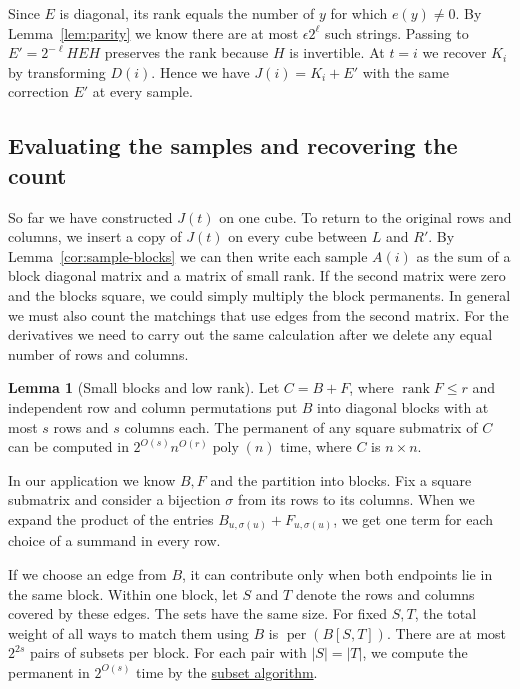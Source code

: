 \documentclass{article}
\theoremstyle{definition}
\newtheorem{lemma}[theorem]{Lemma}
\DeclareMathOperator{\per}{per}
\DeclareMathOperator{\rank}{rank}
\begin{document}
Since \(E\) is diagonal, its rank equals the number of \(y\) for
which \(e(y)\ne0\). By Lemma~\ref{lem:parity} we know there are
at most \(\epsilon 2^\ell\) such strings. Passing to
\(E'=2^{-\ell}HEH\) preserves the rank because \(H\) is invertible. At \(t=i\) we
recover \(K_i\) by transforming \(D(i)\). Hence we have
\(J(i)=K_i+E'\) with the same correction \(E'\) at every sample.

\subsection*{Evaluating the samples and recovering the count}\label{sec:sample-evaluation}

So far we have constructed \(J(t)\) on one cube. To return to the
original rows and columns, we insert a copy of \(J(t)\) on every
cube between \(L\) and \(R'\). By Lemma~\ref{cor:sample-blocks} we can
then write each sample \(A(i)\) as the sum of a block
diagonal matrix and a matrix of small rank. If the second matrix were
zero and the blocks square, we could simply multiply the block
permanents. In general we must also count the matchings that use edges
from the second matrix. For the derivatives we need to carry out the same
calculation after we delete any equal number of rows and columns.

\begin{lemma}[Small blocks and low rank]\label{lem:blocks}
Let \(C=B+F\), where \(\rank F\le r\) and independent row and column
permutations put \(B\) into diagonal blocks with at most \(s\) rows and
\(s\) columns each. The permanent of any square submatrix of \(C\) can
be computed in \(2^{O(s)}n^{O(r)}\operatorname{poly}(n)\) time, where
\(C\) is \(n\times n\).
\end{lemma}

In our application we know \(B,F\) and the partition into blocks.
Fix a square submatrix and consider a bijection \(\sigma\) from its rows
to its columns. When we expand the product of the entries
\(B_{u,\sigma(u)}+F_{u,\sigma(u)}\), we get one term for each choice
of a summand in every row.

If we choose an edge from \(B\), it can contribute only when both
endpoints lie in the same block. Within one block, let \(S\) and \(T\)
denote the rows and columns covered by these edges. The sets have the
same size. For fixed \(S,T\), the total weight of all ways to match
them using \(B\) is \(\per(B[S,T])\). There are at most \(2^{2s}\)
pairs of subsets per block. For each pair with \(|S|=|T|\), we compute
the permanent in \(2^{O(s)}\) time by the
\hyperref[alg:subset-permanent]{subset algorithm}.
\end{document}
